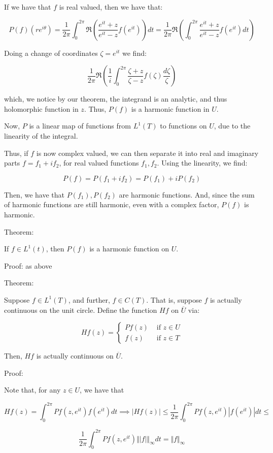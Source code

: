 \documentclass[10pt]{article}
\begin{document}
If we have that $f$ is real valued, then we have that:

$$ P(f) (re^{i\theta}) = \frac{1}{2\pi} \int_0^{2\pi} \Re \left(\frac{e^{it} + z}{e^{it} - z} f(e^{it})\right)dt = \frac{1}{2\pi} \Re \left(   \int_0^{2\pi} \frac{e^{it} + z}{e^{it} - z} f(e^{it}) dt \right)$$

Doing a change of coordinates $\zeta = e^{it}$ we find:

$$\frac{1}{2\pi} \Re \left( \frac{1}{i}  \int_0^{2\pi} \frac{\zeta + z}{\zeta - z} f(\zeta) \frac{d\zeta}{\zeta} \right)$$

which, we notice by our theorem, the integrand is an analytic, and thus holomorphic function in $z$. Thus, $P(f)$ is a harmonic function in $U$.

Now, $P$ is a linear map of functions from $L^1(T)$ to functions on $U$, due to the linearity of the integral. 

Thus, if $f$ is now complex valued, we can then separate it into real and imaginary parts $f = f_1 + i f_2$, for real valued functions $f_1, f_2$. Using the linearity, we find:

$$P(f) = P(f_1 + if_2) = P(f_1) + i P(f_2)$$

Then, we have that $P(f_1), P(f_2)$ are harmonic functions. And, since the sum of harmonic functions are still harmonic, even with a complex factor, $P(f)$ is harmonic.

Theorem:

If $f \in L^1(t)$, then $P(f)$ is a harmonic function on $U$. 

Proof: as above

Theorem:

Suppose $f \in L^1(T)$, and further, $f \in C(T)$. That is, suppose $f$ is actually continuous on the unit circle. Define the function $Hf$ on $\overline{U}$ via:

$$ Hf(z) = \begin{cases} Pf(z) & \text{ if } z \in U \\ f(z) & \text{ if } z \in T \end{cases}$$

Then, $Hf$ is actually continuous on $\overline{U}$. 

Proof:

Note that, for any $z \in U$, we have that

$$Hf(z) = \int_0^{2\pi} Pf(z, e^{it}) f(e^{it}) dt \implies |Hf(z)| \leq \frac{1}{2\pi} \int_0^{2\pi} Pf(z,e^{it}) |f(e^{it})| dt \leq$$

$$\frac{1}{2\pi} \int_0^{2\pi} Pf(z,e^{it}) \Vert |f| \Vert_\infty dt  = \Vert f \Vert_\infty$$
\end{document}
